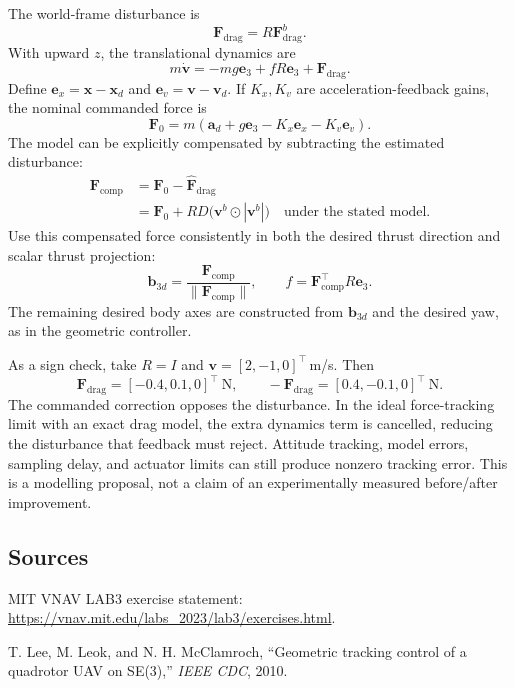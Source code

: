 The world-frame disturbance is
\begin{equation}
\mathbf F_{\mathrm{drag}}=R\mathbf F^b_{\mathrm{drag}}.
\end{equation}
With upward $z$, the translational dynamics are
\begin{equation}
m\dot{\mathbf v}=-mg\mathbf e_3+fR\mathbf e_3+\mathbf F_{\mathrm{drag}}.
\end{equation}
Define $\mathbf e_x=\mathbf x-\mathbf x_d$ and
$\mathbf e_v=\mathbf v-\mathbf v_d$. If $K_x,K_v$ are acceleration-feedback
gains, the nominal commanded force is
\begin{equation}
\mathbf F_0=m\left(\mathbf a_d+g\mathbf e_3-K_x\mathbf e_x-K_v\mathbf e_v\right).
\end{equation}
The model can be explicitly compensated by subtracting the estimated disturbance:
\begin{align}
\mathbf F_{\mathrm{comp}}
&=\mathbf F_0-\widehat{\mathbf F}_{\mathrm{drag}}\\
&=\mathbf F_0+RD\bigl(\mathbf v^b\odot|\mathbf v^b|\bigr)
\quad\text{under the stated model.}
\end{align}
Use this compensated force consistently in both the desired thrust direction
and scalar thrust projection:
\begin{equation}
\mathbf b_{3d}=\frac{\mathbf F_{\mathrm{comp}}}{\|\mathbf F_{\mathrm{comp}}\|},
\qquad f=\mathbf F_{\mathrm{comp}}^\top R\mathbf e_3.
\end{equation}
The remaining desired body axes are constructed from $\mathbf b_{3d}$ and the
desired yaw, as in the geometric controller.

As a sign check, take $R=I$ and $\mathbf v=[2,-1,0]^\top$\,m/s. Then
\begin{equation}
\mathbf F_{\mathrm{drag}}=[-0.4,0.1,0]^\top\ \mathrm N,
\qquad-\mathbf F_{\mathrm{drag}}=[0.4,-0.1,0]^\top\ \mathrm N.
\end{equation}
The commanded correction opposes the disturbance. In the ideal force-tracking
limit with an exact drag model, the extra dynamics term is cancelled, reducing
the disturbance that feedback must reject. Attitude tracking, model errors,
sampling delay, and actuator limits can still produce nonzero tracking error.
This is a modelling proposal, not a claim of an experimentally measured
before/after improvement.

\subsection*{Sources}
MIT VNAV LAB3 exercise statement:
\url{https://vnav.mit.edu/labs_2023/lab3/exercises.html}.\par
T. Lee, M. Leok, and N. H. McClamroch, ``Geometric tracking control of a quadrotor
UAV on SE(3),'' \emph{IEEE CDC}, 2010.

